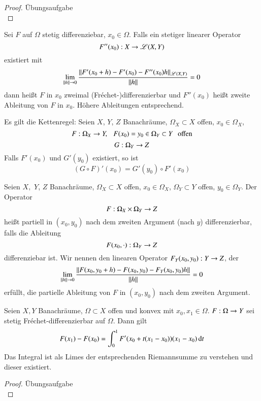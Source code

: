 \begin{proof} 
    Übungsaufgabe \[\]
\end{proof}

\begin{defi}
    Sei $F$ auf $\Omega$ stetig differenziebar, $x_0\in \Omega$. Falls ein stetiger linearer Operator
    \[
        F''(x_0):X\rightarrow \mathscr L(X,Y)
    \]
    existiert mit
    \[
        \lim_{\|h\|\rightarrow 0}\frac{\|F'(x_0+h)-F'(x_0)-F''(x_0)h\|_{\mathscr L(X,Y)}}{\|h\|}=0
    \]
    dann heißt $F$ in $x_0$ zweimal (Fréchet-)differenzierbar und $F''(x_0)$ heißt zweite Ableitung
    von $F$ in $x_0$. Höhere Ableitungen entsprechend.
\end{defi}

\begin{remark}
    Es gilt die Kettenregel:
    Seien $X$, $Y$, $Z$ Banachräume, $\Omega_X\subset X$ offen, $x_0\in \Omega_X$,
    \[
        F:\Omega_X\rightarrow Y, \hspace{.25cm} F(x_0)=y_0\in \Omega_Y\subset Y \hspace{.25cm} \text{offen}
    \]
    \[
        G:\Omega_Y\rightarrow Z
    \]
    Falls $F'(x_0)$ und $G'(y_0)$ existiert, so ist 
    \[
    (G\circ F)'(x_0)=G'(y_0)\circ F'(x_0)
    \]
\end{remark}

\begin{defi}
    Seien $X,$ $Y$, $Z$ Banachräume, $\Omega_X\subset X$ offen, $x_0\in \Omega_X$, $\Omega_Y\subset Y$ 
    offen, $y_0\in \Omega_Y$. Der Operator
    \[
        F: \Omega_X \times \Omega_Y \rightarrow Z 
    \]
    heißt partiell in $(x_0,y_0)$ nach dem zweiten Argument (nach $y$) differenzierbar, falls die 
    Ableitung 
    \[
        F(x_0, \cdot) : \Omega_Y \rightarrow Z 
    \]
    differenziebar ist. Wir nennen den linearen Operator $F_Y(x_0,y_0): Y\rightarrow Z$, der
    \[
        \lim_{\|h\|\rightarrow 0} \frac{\| F(x_0,y_0+h) - F(x_0,y_0) - F_Y( x_0,y_0)h \|}{\|h\|} = 0 
    \]
    erfüllt, die partielle Ableitung von $F$ in $(x_0,y_0)$ nach dem zweiten Argument.
\end{defi}

\begin{prop}\label{1.10}
    Seien $X,Y$ Banachräume, $\Omega \subset X $ offen und konvex mit $x_0, x_1\in \Omega$. 
    $F: \Omega \rightarrow Y$ sei stetig Fréchet-differenzierbar auf $\Omega$. Dann gilt
    \[
        F(x_1)-F(x_0)=\int_{0}^1 F'(x_0+t(x_1-x_0))(x_1-x_0)\, \mathrm{d} t
    \]
    Das Integral ist als Limes der entsprechenden Riemannsumme zu verstehen und dieser existiert.
\end{prop}

\begin{proof}
    Übungsaufgabe \[\]
\end{proof}

